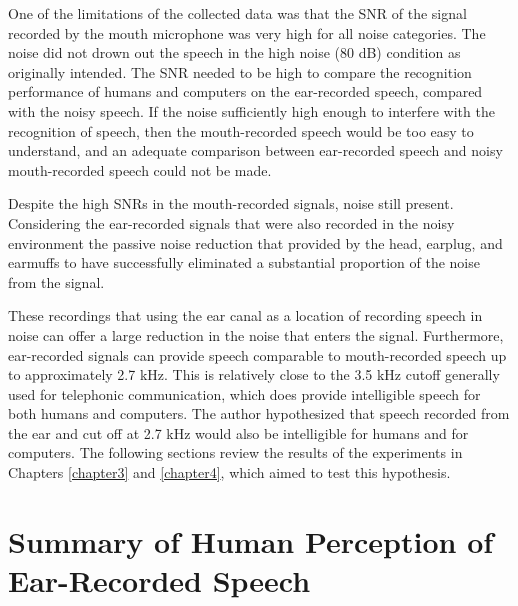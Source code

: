 One of the limitations of the collected data was that the SNR of the signal recorded by the mouth microphone was very high for all noise categories.  The noise did not drown out the speech in the high noise (80 dB) condition as originally intended.  The SNR needed to be high to compare the recognition performance of humans and computers on the ear-recorded speech, compared with the noisy \DIFdelbegin {}\DIFdelend \DIFaddbegin {}\DIFaddend speech.  If the noise \DIFdelbegin {}\DIFdelend \DIFaddbegin {}\DIFaddend sufficiently high enough to interfere with the recognition of speech, then the mouth-recorded speech would be too easy to understand, and an adequate comparison between ear-recorded speech and noisy mouth-recorded speech could not be made.

Despite the high SNRs in the mouth-recorded signals, noise \DIFdelbegin {}\DIFdelend \DIFaddbegin {}\DIFaddend still present.  Considering the ear-recorded signals that were also recorded in the noisy environment%
\DIFaddbegin \DIFadd{, }\DIFaddend the passive noise reduction that \DIFdelbegin {}\DIFdelend \DIFaddbegin {}\DIFaddend provided by the head, earplug, and earmuffs \DIFdelbegin {}\DIFdelend \DIFaddbegin {}\DIFaddend to have successfully eliminated a substantial proportion of the noise from the signal.

These recordings \DIFdelbegin {}\DIFdelend \DIFaddbegin {}\DIFaddend that using the ear canal as a location of recording speech in noise can offer a large reduction in the noise that enters the signal.  Furthermore, ear-recorded signals can provide speech comparable to mouth-recorded speech up to approximately 2.7 kHz.  This is relatively close to the 3.5 kHz cutoff generally used for telephonic communication, which does provide intelligible speech for both humans and computers. The author hypothesized that speech recorded from the ear and cut off at 2.7 kHz would also be intelligible for humans and for computers.  The following sections \DIFdelbegin {}\DIFdelend review the results of the experiments in Chapters \ref{chapter3} and \ref{chapter4}, which aimed to test this hypothesis.


\section{Summary of Human Perception of Ear-Recorded Speech}\label{sec:chap3-review}

